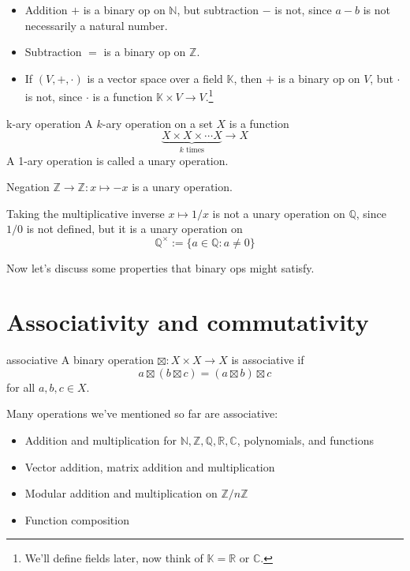 \begin{ex}
\begin{itemize}
\item Addition $+$ is a binary op on $\mathbb N$, but subtraction $-$ is not, since $a-b$ is not necessarily a natural number.
\item Subtraction $=$ is a binary op on $\mathbb Z$.
\item If $(V,+,\cdot)$ is a vector space over a field $\mathbb K$, then $+$ is a binary op on $V$, but $\cdot$ is not, since $\cdot$ is a function $\mathbb K\times V\to V$.\footnote{We'll define fields later, now think of $\mathbb K=\mathbb R$ or $\mathbb C$.}
\end{itemize}
\end{ex}
\begin{defn}{k-ary operation}
A $k$-ary operation on a set $X$ is a function 
$$\underbrace{X\times X\times \cdots X}_{k \text{ times}}\to X$$
A 1-ary operation is called a unary operation.
\end{defn}


\begin{ex}
Negation $\mathbb Z\to\mathbb Z: x\mapsto -x$ is a unary operation.

Taking the multiplicative inverse $x\mapsto 1/x$ is not a unary operation on $\mathbb Q$, since $1/0$ is not defined, but it is a unary operation on 
$$\mathbb Q^\times :=\{a\in\mathbb Q:a\ne 0\}$$
\end{ex}

Now let's discuss some properties that binary ops might satisfy.

\section{Associativity and commutativity}
\begin{defn}{associative}
A binary operation $\boxtimes:X\times X\to X$ is associative if 
$$a\boxtimes (b\boxtimes c) = (a\boxtimes b)\boxtimes c$$
for all $a,b,c\in X$.
\end{defn}

Many operations we've mentioned so far are associative:
\begin{itemize}
\item Addition and multiplication for $\mathbb {N,Z,Q,R,C}$, polynomials, and functions
\item Vector addition, matrix addition and multiplication
\item Modular addition and multiplication on $\mathbb Z/n\mathbb Z$
\item Function composition
\end{itemize}

